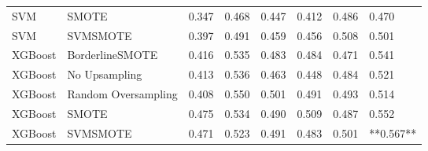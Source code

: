 \begin{tabular}{llllllll}
                         SVM &               SMOTE & 0.347 &                     0.468 &                 0.447 &                  0.412 &                                   0.486 &     0.470 \\
                         SVM &            SVMSMOTE & 0.397 &                     0.491 &                 0.459 &                  0.456 &                                   0.508 &     0.501 \\
                     XGBoost &     BorderlineSMOTE & 0.416 &                     0.535 &                 0.483 &                  0.484 &                                   0.471 &     0.541 \\
                     XGBoost &       No Upsampling & 0.413 &                     0.536 &                 0.463 &                  0.448 &                                   0.484 &     0.521 \\
                     XGBoost & Random Oversampling & 0.408 &                     0.550 &                 0.501 &                  0.491 &                                   0.493 &     0.514 \\
                     XGBoost &               SMOTE & 0.475 &                     0.534 &                 0.490 &                  0.509 &                                   0.487 &     0.552 \\
                     XGBoost &            SVMSMOTE & 0.471 &                     0.523 &                 0.491 &                  0.483 &                                   0.501 & **0.567** \\
\bottomrule
\end{tabular}
